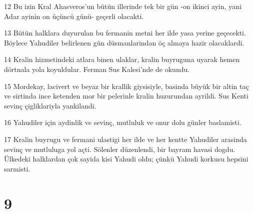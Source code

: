 \par 12 Bu izin Kral Ahasveros'un bütün illerinde tek bir gün -on ikinci ayin, yani Adar ayinin on üçüncü günü- geçerli olacakti.
\par 13 Bütün halklara duyurulan bu fermanin metni her ilde yasa yerine geçecekti. Böylece Yahudiler belirlenen gün düsmanlarindan öç almaya hazir olacaklardi.
\par 14 Kralin hizmetindeki atlara binen ulaklar, kralin buyruguna uyarak hemen dörtnala yola koyuldular. Ferman Sus Kalesi'nde de okundu.
\par 15 Mordekay, lacivert ve beyaz bir krallik giysisiyle, basinda büyük bir altin taç ve sirtinda ince ketenden mor bir pelerinle kralin huzurundan ayrildi. Sus Kenti sevinç çigliklariyla yankilandi.
\par 16 Yahudiler için aydinlik ve sevinç, mutluluk ve onur dolu günler baslamisti.
\par 17 Kralin buyrugu ve fermani ulastigi her ilde ve her kentte Yahudiler arasinda sevinç ve mutluluga yol açti. Sölenler düzenlendi, bir bayram havasi dogdu. Ülkedeki halklardan çok sayida kisi Yahudi oldu; çünkü Yahudi korkusu hepsini sarmisti.

\chapter{9}

